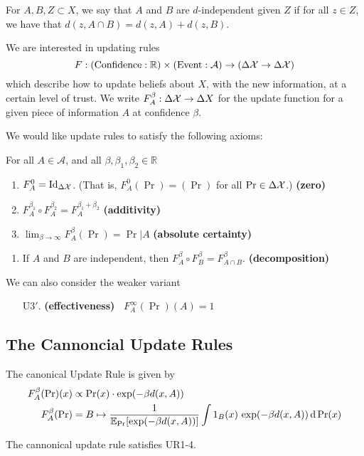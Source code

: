 \documentclass{article}
\DeclareMathOperator{\supp}{\mathrm{Supp}}
\begin{document}
\begin{defn}
For $A,B,Z \subset X$,
we say that $A$ and $B$ are $d$-independent given $Z$ if
for all $z \in Z$, we have that
$d(z, A \cap B) = d(z, A) + d(z,B)$.
\end{defn}

We are interested in updating rules
\[
    F: (\text{Confidence} : \mathbb R) \times (\text{Event} : \mathcal A) \to (\Delta\mathcal X  \to \Delta \mathcal X)
\]
which describe how to update beliefs about $X$, with the new information, at a certain level of trust. We write $F^\beta_A : \Delta\mathcal X \to \Delta X$ for the update function for a given piece of information $A$ at confidence $\beta$.

We would like update rules to satisfy the following axioms:

For all $A \in \mathcal A$, and all $\beta,\beta_1, \beta_2 \in \mathbb R$
\begin{enumerate}[label=UR\arabic{*}.,nosep]
    \item  $F^{0}_A  =  \mathrm{Id}_{\Delta\mathcal X}$. (That is, $F^{0}_A(\Pr) = (\Pr)$ for all $\Pr \in \Delta\mathcal X$.)
        \hfill \textbf{(zero)}
    \item $F^{\beta_1}_A \circ F^{\beta_2}_A = F^{\beta_1 + \beta_2}_A$
        \hfill \textbf{(additivity)}
    \item $\displaystyle \lim_{\beta\to\infty} F^\beta_A (\Pr) = \Pr|A$
        \hfill \textbf{(absolute certainty)}
\end{enumerate}

\begin{enumerate}[resume,label=UR\arabic{*}.]
    \item If $A$ and $B$ are independent, then $F^{\beta}_A \circ F^{\beta}_B = F^{\beta}_{A \cap B}$.
        \hfill \textbf{(decomposition)}
\end{enumerate}

We can also consider the weaker variant
\begin{enumerate}
    \item[U3$'$.]  \textbf{(effectiveness)~} $F^\infty_A (\Pr)(A) = 1$

\end{enumerate}


\subsection{The Cannoncial Update Rules}
The canonical Update Rule is given by
\begin{align*}
    F^\beta_A(\Pr)(x) &\propto \Pr(x) \cdot \exp(-\beta d(x, A)) \\
    F^\beta_A(\Pr) &= B \mapsto \frac{1}{\operatorname*{\mathbb{E}}_{\Pr}[\exp(-\beta d(x,A))]}\int
        1_B(x) \, \exp(-\beta d(x, A)) \,\mathrm d\Pr(x)
\end{align*}
\begin{prop}
    The cannonical update rule satisfies UR1-4.
\end{prop}
\end{document}
